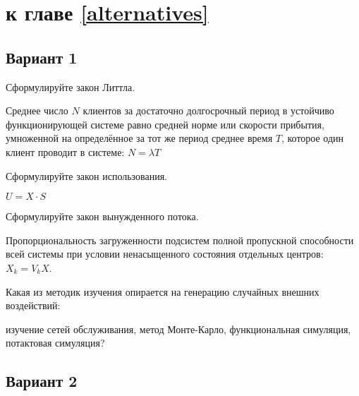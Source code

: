 \section{\Questions к главе \ref{alternatives}} %

\subsection*{Вариант 1}

\begin{questions}

\question[3] Сформулируйте закон Литтла.
\begin{solution}[2cm]
Среднее число $N$ клиентов за достаточно долгосрочный период в устойчиво функционирующей системе  равно средней норме или скорости прибытия, умноженной на определённое за тот же период среднее время $T$, которое один клиент проводит в системе: $N = \lambda T$
\end{solution}

\question[3] Сформулируйте закон использования.
\begin{solution}[2cm]
$U = X \cdot S $
\end{solution}

\question[3] Сформулируйте закон вынужденного потока.
\begin{solution}[2cm]
Пропорциональность загруженности подсистем полной пропускной способности всей системы при условии ненасыщенного состояния отдельных центров: $X_k = V_k X$.
\end{solution}

\question[3] Какая из методик изучения опирается на генерацию случайных внешних воздействий:
\begin{choices}
\choice изучение сетей обслуживания,
\correctchoice метод Монте-Карло,
\choice функциональная симуляция,
\choice потактовая симуляция?
\end{choices}


\end{questions}

\subsection*{Вариант 2}

